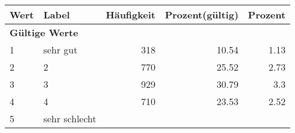      \begin{longtable}{lXrrr}
     \toprule
     \textbf{Wert} & \textbf{Label} & \textbf{Häufigkeit} & \textbf{Prozent(gültig)} & \textbf{Prozent} \\
     \endhead
     \midrule
     \multicolumn{5}{l}{\textbf{Gültige Werte}}\\

     1 &
     \multicolumn{1}{X}{ sehr gut   } &


       \num{318} &
       \num[round-mode=places,round-precision=2]{10,54} &
         \num[round-mode=places,round-precision=2]{1,13} \\

     2 &
     \multicolumn{1}{X}{ 2   } &


       \num{770} &
       \num[round-mode=places,round-precision=2]{25,52} &
         \num[round-mode=places,round-precision=2]{2,73} \\

     3 &
     \multicolumn{1}{X}{ 3   } &


       \num{929} &
       \num[round-mode=places,round-precision=2]{30,79} &
         \num[round-mode=places,round-precision=2]{3,3} \\

     4 &
     \multicolumn{1}{X}{ 4   } &


       \num{710} &
       \num[round-mode=places,round-precision=2]{23,53} &
         \num[round-mode=places,round-precision=2]{2,52} \\

     5 &
     \multicolumn{1}{X}{ sehr schlecht   } &



\end{longtable}
